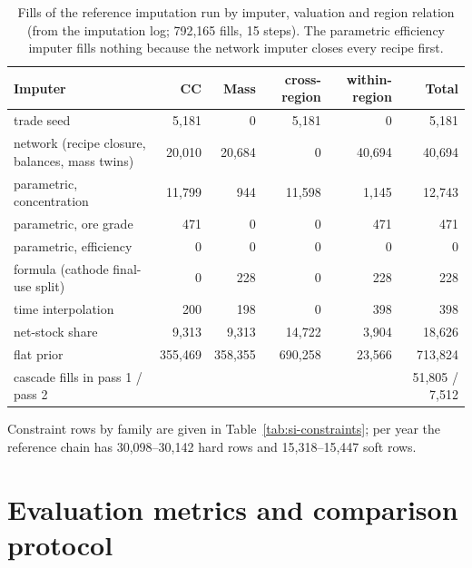 \documentclass[11pt]{article}
\begin{document}
\begin{table}[h]
\centering\small
\begin{tabular}{@{}lrrrrr@{}}
\toprule
Imputer & CC & Mass & cross-region & within-region & Total \\
\midrule
trade seed & 5{,}181 & 0 & 5{,}181 & 0 & 5{,}181 \\
network (recipe closure, balances, mass twins) & 20{,}010 & 20{,}684 & 0 & 40{,}694 & 40{,}694 \\
parametric, concentration & 11{,}799 & 944 & 11{,}598 & 1{,}145 & 12{,}743 \\
parametric, ore grade & 471 & 0 & 0 & 471 & 471 \\
parametric, efficiency & 0 & 0 & 0 & 0 & 0 \\
formula (cathode final-use split) & 0 & 228 & 0 & 228 & 228 \\
time interpolation & 200 & 198 & 0 & 398 & 398 \\
net-stock share & 9{,}313 & 9{,}313 & 14{,}722 & 3{,}904 & 18{,}626 \\
flat prior & 355{,}469 & 358{,}355 & 690{,}258 & 23{,}566 & 713{,}824 \\
\midrule
cascade fills in pass 1 / pass 2 & & & & & 51{,}805 / 7{,}512 \\
\bottomrule
\end{tabular}
\caption{Fills of the reference imputation run by imputer, valuation and
region relation (from the imputation log; 792{,}165 fills, 15 steps). The
parametric efficiency imputer fills nothing because the network imputer
closes every recipe first.}
\label{tab:si-fills}
\end{table}

Constraint rows by family are given in Table~\ref{tab:si-constraints};
per year the reference chain has 30{,}098--30{,}142 hard rows and
15{,}318--15{,}447 soft rows.

\section{Evaluation metrics and comparison protocol}\label{si:evaluation}
\end{document}
